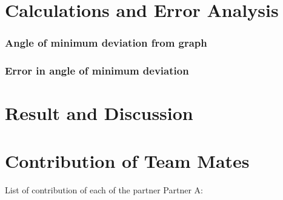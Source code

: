 \documentclass{article}
\begin{document}
\section{Calculations and Error Analysis}
\subsubsection{Angle of minimum deviation from graph}
\subsubsection{Error in angle of minimum deviation}
\section{Result and Discussion}
\section{Contribution of Team Mates}
List of contribution of each of the partner
Partner A:
\end{document}
